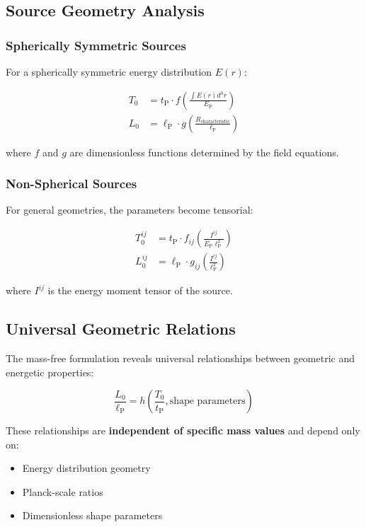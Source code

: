 \documentclass[12pt,a4paper]{article}
\newcommand{\Tzero}{T_0}
\newcommand{\lP}{\ell_{\text{P}}}
\newcommand{\tP}{t_{\text{P}}}
\newcommand{\EP}{E_{\text{P}}}
\begin{document}
	\subsection{Source Geometry Analysis}
	\label{subsec:source_geometry}
	
	\subsubsection{Spherically Symmetric Sources}
	
	For a spherically symmetric energy distribution $E(r)$:
	
	\begin{align}
		\Tzero &= \tP \cdot f\left(\frac{\int E(r) d^3r}{\EP}\right) \\
		L_0 &= \lP \cdot g\left(\frac{R_{\text{characteristic}}}{\lP}\right)
	\end{align}
	
	where $f$ and $g$ are dimensionless functions determined by the field equations.
	
	\subsubsection{Non-Spherical Sources}
	
	For general geometries, the parameters become tensorial:
	
	\begin{align}
		\Tzero^{ij} &= \tP \cdot f_{ij}\left(\frac{I^{ij}}{\EP \lP^2}\right) \\
		L_0^{ij} &= \lP \cdot g_{ij}\left(\frac{I^{ij}}{\lP^2}\right)
	\end{align}
	
	where $I^{ij}$ is the energy moment tensor of the source.
	
	\subsection{Universal Geometric Relations}
	\label{subsec:geometric_relations}
	
	The mass-free formulation reveals universal relationships between geometric and energetic properties:
	
	\begin{equation}
		\frac{L_0}{\lP} = h\left(\frac{\Tzero}{\tP}, \text{shape parameters}\right)
		\label{eq:geometric_relation}
	\end{equation}
	
	These relationships are \textbf{independent of specific mass values} and depend only on:
	\begin{itemize}
		\item Energy distribution geometry
		\item Planck-scale ratios
		\item Dimensionless shape parameters
	\end{itemize}
	
\end{document}
